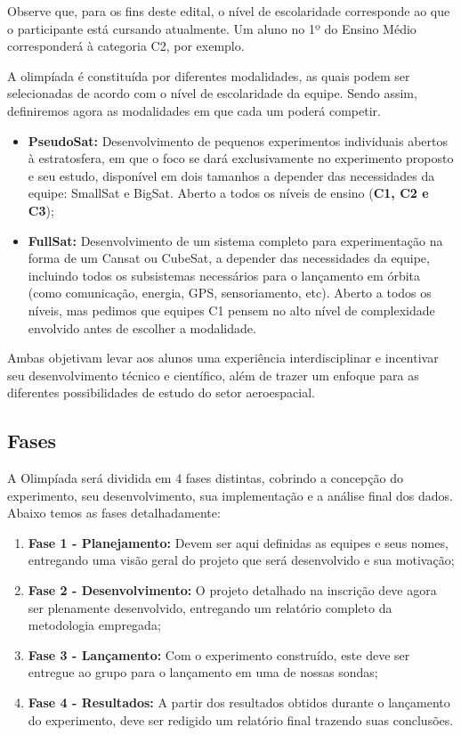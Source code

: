         \par Observe que, para os fins deste edital, o nível de escolaridade corresponde ao que o participante está cursando atualmente. Um aluno no 1º do Ensino Médio corresponderá à categoria C2, por exemplo.
    
        \par A olimpíada é constituída por diferentes modalidades, as quais podem ser selecionadas de acordo com o nível de escolaridade da equipe. Sendo assim, definiremos agora as modalidades em que cada um poderá competir.
        
        \begin{itemize}
            \item \textbf{PseudoSat:} Desenvolvimento de pequenos experimentos individuais abertos à estratosfera, em que o foco se dará exclusivamente no experimento proposto e seu estudo, disponível em dois tamanhos a depender das necessidades da equipe: SmallSat e BigSat. Aberto a todos os níveis de ensino (\textbf{C1, C2 e C3});
            
            \item \textbf{FullSat:} Desenvolvimento de um sistema completo para experimentação na forma de um Cansat ou CubeSat, a depender das necessidades da equipe, incluindo todos os subsistemas necessários para o lançamento em órbita (como comunicação, energia, GPS, sensoriamento, etc). Aberto a todos os níveis, mas pedimos que equipes C1 pensem no alto nível de complexidade envolvido antes de escolher a modalidade.
        \end{itemize}

        Ambas objetivam levar aos alunos uma experiência interdisciplinar e incentivar seu desenvolvimento técnico e científico, além de trazer um enfoque para as diferentes possibilidades de estudo do setor aeroespacial.

    \subsection{Fases}
        A Olimpíada será dividida em 4 fases distintas, cobrindo a concepção do experimento, seu desenvolvimento, sua implementação e a análise final dos dados. Abaixo temos as fases detalhadamente:
        \begin{enumerate}
            \item \textbf{Fase 1 - Planejamento:} Devem ser aqui definidas as equipes e seus nomes, entregando uma visão geral do projeto que será desenvolvido e sua motivação;
            \item \textbf{Fase 2 - Desenvolvimento:} O projeto detalhado na inscrição deve agora ser plenamente desenvolvido, entregando um relatório completo da metodologia empregada;
            \item \textbf{Fase 3 - Lançamento:} Com o experimento construído, este deve ser entregue ao grupo para o lançamento em uma de nossas sondas;
            \item \textbf{Fase 4 - Resultados:} A partir dos resultados obtidos durante o lançamento do experimento, deve ser redigido um relatório final trazendo suas conclusões.
        \end{enumerate}

